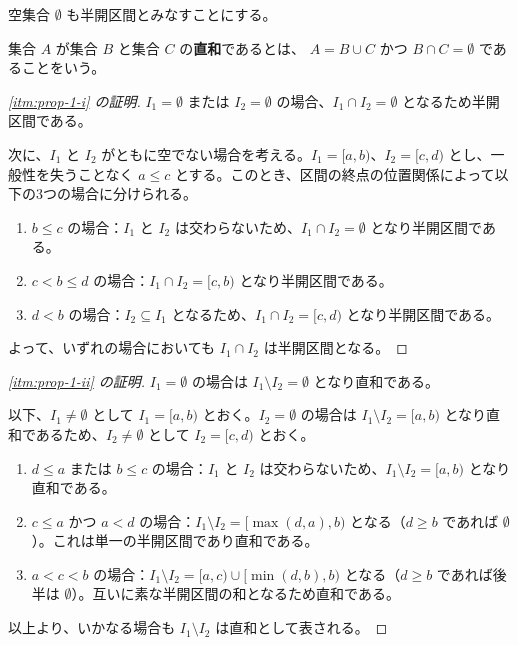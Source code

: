 \documentclass[article,paper=a4paper]{jlreq}
\begin{document}
\begin{rem}
    空集合 $\emptyset$ も半開区間とみなすことにする。
\end{rem}
    
\begin{rem}
    集合 $A$ が集合 $B$ と集合 $C$ の\textbf{直和}であるとは、 $A = B \cup C$ かつ $B \cap C = \emptyset$ であることをいう。
\end{rem}

\begin{proof}[\ref{itm:prop-1-i} の証明]
    $I_1 = \emptyset$ または $I_2 = \emptyset$ の場合、$I_1 \cap I_2 = \emptyset$ となるため半開区間である。\par
    次に、$I_1$ と $I_2$ がともに空でない場合を考える。$I_1 = [a,b)$、$I_2 = [c,d)$ とし、一般性を失うことなく $a \leq c$ とする。このとき、区間の終点の位置関係によって以下の3つの場合に分けられる。
    \begin{enumerate}[label=(\arabic*)\,]
        \item $b \leq c$ の場合：$I_1$ と $I_2$ は交わらないため、$I_1 \cap I_2 = \emptyset$ となり半開区間である。
        \item $c < b \leq d$ の場合：$I_1 \cap I_2 = [c,b)$ となり半開区間である。
        \item $d < b$ の場合：$I_2 \subseteq I_1$ となるため、$I_1 \cap I_2 = [c,d)$ となり半開区間である。
    \end{enumerate}
    よって、いずれの場合においても $I_1 \cap I_2$ は半開区間となる。
\end{proof}

\begin{proof}[\ref{itm:prop-1-ii} の証明]
    $I_1 = \emptyset$ の場合は $I_1 \setminus I_2 = \emptyset$ となり直和である。\par
    以下、$I_1 \neq \emptyset$ として $I_1 = [a,b)$ とおく。$I_2 = \emptyset$ の場合は $I_1 \setminus I_2 = [a,b)$ となり直和であるため、$I_2 \neq \emptyset$ として $I_2 = [c,d)$ とおく。
    \begin{enumerate}[label=(\arabic*)\,]
        \item $d \leq a$ または $b \leq c$ の場合：$I_1$ と $I_2$ は交わらないため、$I_1 \setminus I_2 = [a,b)$ となり直和である。
        \item $c \leq a$ かつ $a < d$ の場合：$I_1 \setminus I_2 = [\max(d, a), b)$ となる（$d \geq b$ であれば $\emptyset$）。これは単一の半開区間であり直和である。
        \item $a < c < b$ の場合：$I_1 \setminus I_2 = [a,c) \cup [\min(d, b), b)$ となる（$d \geq b$ であれば後半は $\emptyset$）。互いに素な半開区間の和となるため直和である。
    \end{enumerate}
    以上より、いかなる場合も $I_1 \setminus I_2$ は直和として表される。
\end{proof}
\end{document}
